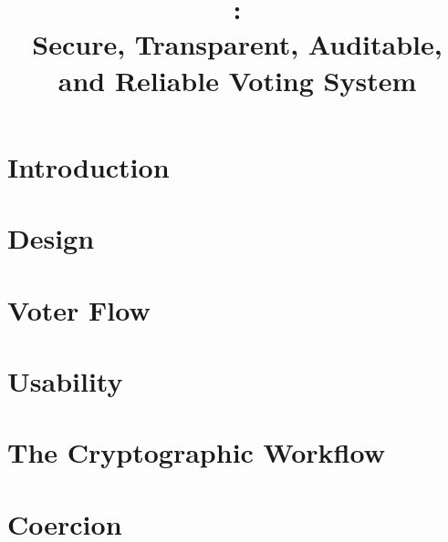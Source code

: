 \documentclass[letterpaper, 10pt, twocolumn]{article}
\title{\projname: \\
Secure, Transparent, Auditable, and Reliable Voting System}
\begin{document}
\maketitle

\begin{abstract}

\end{abstract}

\section{Introduction}


\section{Design}


\section{Voter Flow}


\section{Usability}


\section{The Cryptographic Workflow}


\section{Coercion}




\end{document}
